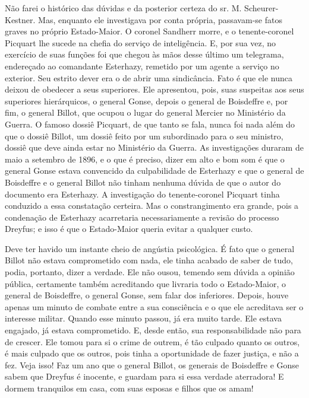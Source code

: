  Não farei o histórico das dúvidas e da posterior certeza do sr. M.
Scheurer-Kestner. Mas, enquanto ele investigava por conta própria,
passavam-se fatos graves no próprio Estado-Maior. O coronel
Sandherr morre, e o tenente-coronel Picquart lhe sucede na chefia do
serviço de inteligência. E, por sua vez, no exercício de suas funções
foi que chegou às mãos desse último um telegrama, endereçado ao
comandante Esterhazy, remetido por um agente 
a serviço no exterior. Seu estrito dever era o de abrir uma sindicância. 
Fato é que ele nunca deixou de obedecer a seus superiores. Ele apresentou, pois, suas
suspeitas aos seus superiores hierárquicos, o general Gonse, depois o
general de Boisdeffre e, por fim, o general Billot, que ocupou o lugar
do general Mercier no Ministério da Guerra. O famoso dossiê Picquart,
de que tanto se fala, nunca foi nada além do que o dossiê Billot, um
dossiê feito por um subordinado para o seu ministro, dossiê que deve
ainda estar no Ministério da Guerra. As investigações duraram de maio a
setembro de 1896, e o que é preciso, dizer em alto e bom som é que o
general Gonse estava convencido da culpabilidade de Esterhazy e que o general
de Boisdeffre e o general Billot não tinham nenhuma dúvida de que o
autor do documento era Esterhazy. A investigação do tenente-coronel
Picquart tinha conduzido a essa constatação certeira. Mas o
constrangimento era grande, pois a condenação de Esterhazy acarretaria
necessariamente a revisão do processo Dreyfus; e isso é que o 
Estado-Maior queria evitar a qualquer custo.

 Deve ter havido um instante cheio de angústia psicológica. É fato que o
general Billot não estava comprometido com nada, ele tinha acabado de
saber de tudo, podia, portanto, dizer a verdade. Ele não ousou, temendo
sem dúvida a opinião pública, certamente também acreditando que
livraria todo o Estado-Maior, o general de Boisdeffre, o general
Gonse, sem falar dos inferiores. Depois, houve apenas um minuto de
combate entre a sua consciência e o que ele acreditava ser o interesse
militar. Quando esse minuto passou, já era muito tarde. Ele estava
engajado, já estava comprometido. E, desde então, sua responsabilidade
não para de crescer. Ele tomou para si o crime de outrem, é tão culpado
quanto os outros, é mais culpado que os outros, pois tinha a
oportunidade de fazer justiça, e não a fez. Veja isso! Faz um ano que o
general Billot, os generais de Boisdeffre e Gonse sabem que Dreyfus é
inocente, e guardam para si essa verdade aterradora! E dormem
tranquilos em casa, com suas esposas e filhos que os amam!

